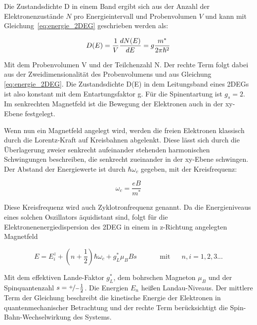 Die Zustandsdichte D in einem Band ergibt sich aus der Anzahl der Elektronenzustände $N$ pro Energieintervall und Probenvolumen $V$ und kann mit Gleichung~\eqref{eq:energie_2DEG} geschrieben werden als:

\begin{equation}
	D(E)=\frac{1}{V}\frac{d N(E)}{d E}=g\frac{m^*}{2\pi\hbar^2}
	\label{eq:2DEG_zustandsdich} 
\end{equation}

Mit dem Probenvolumen V und der Teilchenzahl N. Der rechte Term folgt dabei aus der Zweidimensionalität des Probenvolumens und aus Gleichung \ref{eq:energie_2DEG}.
Die Zustandsdichte D(E) in dem Leitungsband eines 2DEGs ist also konstant mit dem Entartungsfaktor g. Für die Spinentartung ist $g_s=2$. Im senkrechten Magnetfeld ist die Bewegung der Elektronen auch in der xy-Ebene festgelegt.

Wenn nun ein Magnetfeld angelegt wird, werden die freien Elektronen klassisch durch die Lorentz-Kraft auf Kreisbahnen abgelenkt. Diese lässt sich durch die Überlagerung zweier senkrecht aufeinander stehenden harmonischen Schwingungen beschreiben, die senkrecht zueinander in der xy-Ebene schwingen. Der Abstand der Energiewerte ist durch $\hbar \omega_c$ gegeben,
mit der Kreisfrequenz:

\begin{equation}
\omega_c=\frac{eB}{m^*}
\label{eq:kreisfrequenz}
\end{equation}

Diese Kreisfrequenz wird auch Zyklotronfrequenz genannt. Da die Energieniveaus eines solchen Oszillators äquidistant sind, folgt für die Elektronenenergiedispersion des 2DEG in einem in z-Richtung angelegten Magnetfeld

\begin{equation}
E=E_i^z +(n+\frac{1}{2})\hbar\omega_c +g_L^*\mu_B Bs \text{~~~~~~~~~~mit~~~~~} n,i=1,2,3...
\label{eq:elektr_disp_bfeld}	
\end{equation}

Mit dem effektiven Lande-Faktor $g^*_L$, dem bohrschen Magneton $\mu_B$ und der Spinquantenzahl $s=\nicefrac{+}{-}\frac{1}{2}$.
Die Energien $E_n$ heißen Landau-Niveaus. Der mittlere Term der Gleichung beschreibt die kinetische Energie der Elektronen
in quantenmechanischer Betrachtung und der rechte Term berücksichtigt die Spin-Bahn-Wechselwirkung des Systems. 

